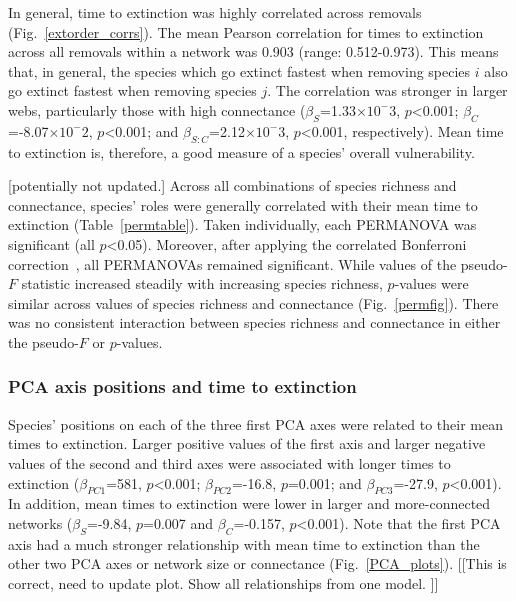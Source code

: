 \documentclass[12pt]{article}
\begin{document}
		In general, time to extinction was highly correlated across removals (Fig.~\ref{extorder_corrs}). The mean Pearson correlation for times to extinction across all removals within a network was 0.903 (range: 0.512-0.973). This means that, in general, the species which go extinct fastest when removing species $i$ also go extinct fastest when removing species $j$. The correlation was stronger in larger webs, particularly those with high connectance ($\beta_{S}$=1.33$\times10^-3$, $p$\textless0.001; $\beta_{C}$=-8.07$\times10^-2$, $p$\textless0.001; and $\beta_{S:C}$=2.12$\times10^-3$, $p$\textless0.001, respectively). Mean time to extinction is, therefore, a good measure of a species' overall vulnerability.


		[potentially not updated.]
		Across all combinations of species richness and connectance, species' roles were generally correlated with their mean time to extinction (Table~\ref{permtable}). Taken individually, each PERMANOVA was significant (all $p$\textless0.05). Moreover, after applying the correlated Bonferroni correction~\citep{Drezner2016}, all PERMANOVAs remained significant. While values of the pseudo-$F$ statistic increased steadily with increasing species richness, $p$-values were similar across values of species richness and connectance (Fig.~\ref{permfig}). There was no consistent interaction between species richness and connectance in either the pseudo-$F$ or $p$-values.


		

		\subsubsection*{PCA axis positions and time to extinction}

			Species' positions on each of the three first PCA axes were related to their mean times to extinction. Larger positive values of the first axis and larger negative values of the second and third axes were associated with longer times to extinction ($\beta_{PC1}$=581, $p$\textless0.001; $\beta_{PC2}$=-16.8, $p$=0.001; and $\beta_{PC3}$=-27.9, $p$\textless0.001). In addition, mean times to extinction were lower in larger and more-connected networks ($\beta_{S}$=-9.84, $p$=0.007 and $\beta_{C}$=-0.157, $p$\textless0.001). Note that the first PCA axis had a much stronger relationship with mean time to extinction than the other two PCA axes or network size or connectance (Fig.~\ref{PCA_plots}).
			[[This is correct, need to update plot. Show all relationships from one model. ]]
\end{document}
